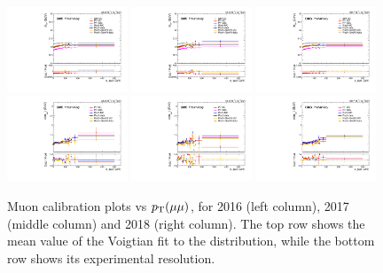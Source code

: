 \begin{figure}[!htb]
      \centering
      \includegraphics[width=0.32\textwidth]{pics/muon_corr/muon_cal/2016/dimu_pt_summary_mean.pdf}
      \includegraphics[width=0.32\textwidth]{pics/muon_corr/muon_cal/2017/dimu_pt_summary_mean.pdf}
      \includegraphics[width=0.32\textwidth]{pics/muon_corr/muon_cal/2018/dimu_pt_summary_mean.pdf}
      \includegraphics[width=0.32\textwidth]{pics/muon_corr/muon_cal/2016/dimu_pt_summary_reso.pdf}
      \includegraphics[width=0.32\textwidth]{pics/muon_corr/muon_cal/2017/dimu_pt_summary_reso.pdf}
      \includegraphics[width=0.32\textwidth]{pics/muon_corr/muon_cal/2018/dimu_pt_summary_reso.pdf}
      \caption{Muon calibration plots vs $p_{\mathrm{T}}(\mu\mu)$, for 2016 (left column), 2017 (middle column) and 2018 (right column).
               The top row shows the mean value of the Voigtian fit to the \mmm distribution, 
               while the bottom row shows its experimental resolution.}
      \label{fig:mucal_dimu_pt}
\end{figure}


